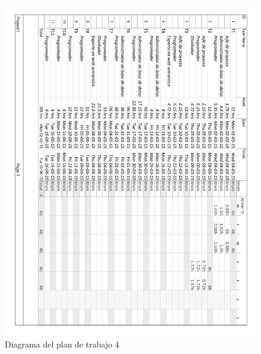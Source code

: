 \begin{figure}[!htp]
	\centering
	\includegraphics[page=4, scale=.8]{fig/real_work_plan_diagram}
	\caption{Diagrama del plan de trabajo 4}
\end{figure}

